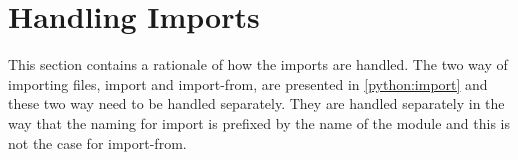 \section{Handling Imports}
This section contains a rationale of how the imports are handled.
The two way of importing files, import and import-from, are presented in \cref{python:import} and these two way need to be handled separately.
They are handled separately in the way that the naming for import is prefixed by the name of the module and this is not the case for import-from.


